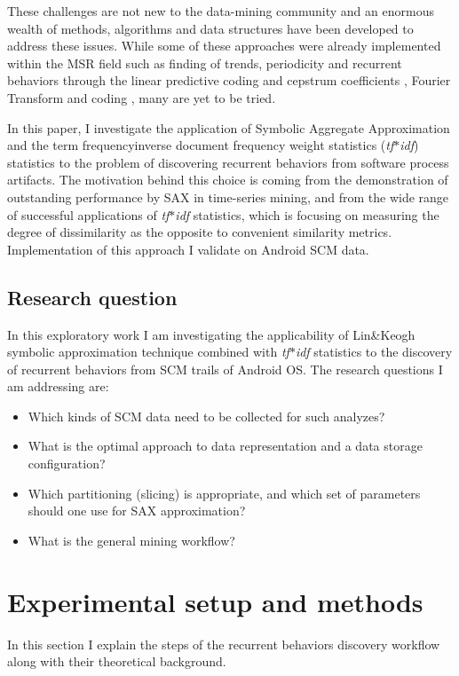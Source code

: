 \documentclass[conference]{worldcomp}
\begin{document}
These challenges are not new to the data-mining community and an enormous wealth 
of methods, algorithms and data structures have been developed to address these issues.
While some of these approaches were already implemented within the MSR field \cite{citeulike:7853299}  
such as finding of trends, periodicity and recurrent behaviors through the linear 
predictive coding and cepstrum coefficients \cite{citeulike:3378725}, 
Fourier Transform \cite{citeulike:10377345} and coding \cite{citeulike:10377366},
many are yet to be tried.

In this paper, I investigate the application of 
Symbolic Aggregate Approximation \cite{citeulike:2821475} and the 
term frequency\textendash inverse document frequency weight statistics (\textit{tf$\ast$idf})
statistics \cite{citeulike:3056638} to the problem of discovering recurrent 
behaviors from software process artifacts. The motivation behind this choice is coming
from the demonstration of outstanding performance by SAX in time-series mining, 
and from the wide range of successful applications of \textit{tf$\ast$idf} 
statistics, which is focusing on measuring the degree of dissimilarity 
as the opposite to convenient similarity metrics. Implementation of this approach I 
validate on Android SCM data.

\subsection{Research question}
In this exploratory work I am investigating the applicability of Lin\&Keogh 
symbolic approximation technique combined with \textit{tf$\ast$idf} statistics to the discovery of 
recurrent behaviors from SCM trails of Android OS.
The research questions I am addressing are: 
\begin{itemize}
 \item Which kinds of SCM data need to be collected for such analyzes?
 \item What is the optimal approach to data representation and a data storage configuration?
 \item Which partitioning (slicing) is appropriate, and which set of parameters should one use for SAX approximation?
 \item What is the general mining workflow?
\end{itemize}

\section{Experimental setup and methods}
In this section I explain the steps of the recurrent behaviors discovery workflow 
along with their theoretical background.
\end{document}

